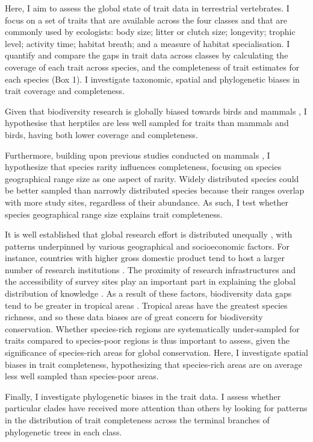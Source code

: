 Here, I aim to assess the global state of trait data in terrestrial vertebrates. I focus on a set of traits that are available across the four classes and that are commonly used by ecologists: body size; litter or clutch size; longevity; trophic level; activity time; habitat breath; and a measure of habitat specialisation. I quantify and compare the gaps in trait data across classes by calculating the coverage of each trait across species, and the completeness of trait estimates for each species (Box 1). I investigate taxonomic, spatial and phylogenetic biases in trait coverage and completeness.

Given that biodiversity research is globally biased towards birds and mammals \citep{Titley2017}, I hypothesise that herptiles are less well sampled for traits than mammals and birds, having both lower coverage and completeness.

Furthermore, building upon previous studies conducted on mammals \citep{Gonzalez-Suarez2012}, I hypothesize that species rarity influences completeness, focusing on species geographical range size as one aspect of rarity. Widely distributed species could be better sampled than narrowly distributed species because their ranges overlap with more study sites, regardless of their abundance. As such, I test whether species geographical range size explains trait completeness. 

It is well established that global research effort is distributed unequally \citep{ONU2015}, with patterns underpinned by various geographical and socioeconomic factors. For instance, countries with higher gross domestic product tend to host a larger number of research institutions \citep{Martin2012}. The proximity of research infrastructures and the accessibility of survey sites play an important part in explaining the global distribution of knowledge \citep{Hortal2015}. As a result of these factors, biodiversity data gaps tend to be greater in tropical areas \citep{Collen2008}. Tropical areas have the greatest species richness, and so these data biases are of great concern for biodiversity conservation. Whether species-rich regions are systematically under-sampled for traits compared to species-poor regions is thus important to assess, given the significance of species-rich areas for global conservation. Here, I investigate spatial biases in trait completeness, hypothesizing that species-rich areas are on average less well sampled than species-poor areas.

Finally, I investigate phylogenetic biases in the trait data. I assess whether particular clades have received more attention than others by looking for patterns in the distribution of trait completeness across the terminal branches of phylogenetic trees in each class.

